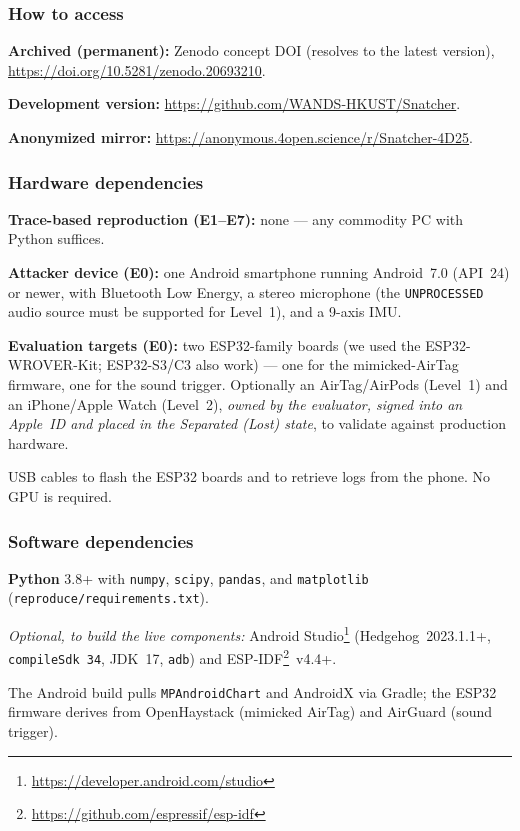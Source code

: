 \documentclass[nonacm,sigconf]{acmart}
\begin{document}
\subsubsection{How to access}
\begin{compactitem}
  \item \textbf{Archived (permanent):} Zenodo concept DOI (resolves to the latest
        version), \url{https://doi.org/10.5281/zenodo.20693210}.
  \item \textbf{Development version:} \url{https://github.com/WANDS-HKUST/Snatcher}.
  \item \textbf{Anonymized mirror:} \url{https://anonymous.4open.science/r/Snatcher-4D25}.
\end{compactitem}

\subsubsection{Hardware dependencies}
\begin{compactitem}
  \item \textbf{Trace-based reproduction (E1--E7):} none --- any commodity PC
        with Python suffices.
  \item \textbf{Attacker device (E0):} one Android smartphone running
        Android~7.0 (API~24) or newer, with Bluetooth Low Energy, a stereo
        microphone (the \texttt{UNPROCESSED} audio source must be supported for
        Level~1), and a 9-axis IMU.
  \item \textbf{Evaluation targets (E0):} two ESP32-family boards
        (we used the ESP32-WROVER-Kit; ESP32-S3/C3 also work) --- one for the
        mimicked-AirTag firmware, one for the sound trigger. Optionally an
        AirTag/AirPods (Level~1) and an iPhone/Apple Watch (Level~2), \emph{owned
        by the evaluator, signed into an Apple~ID and placed in the Separated
        (Lost) state}, to validate against production hardware.
  \item USB cables to flash the ESP32 boards and to retrieve logs from the phone.
        No GPU is required.
\end{compactitem}

\subsubsection{Software dependencies}
\begin{compactitem}
  \item \textbf{Python} 3.8+ with \texttt{numpy}, \texttt{scipy},
        \texttt{pandas}, and \texttt{matplotlib} (\texttt{reproduce/requirements.txt}).
  \item \emph{Optional, to build the live components:} Android
        Studio\footnote{\url{https://developer.android.com/studio}}
        (Hedgehog~2023.1.1+, \texttt{compileSdk~34}, JDK~17, \texttt{adb}) and
        ESP-IDF\footnote{\url{https://github.com/espressif/esp-idf}}~v4.4+.
  \item The Android build pulls \texttt{MPAndroidChart} and AndroidX via Gradle;
        the ESP32 firmware derives from OpenHaystack (mimicked AirTag) and
        AirGuard (sound trigger).
\end{compactitem}
\end{document}
